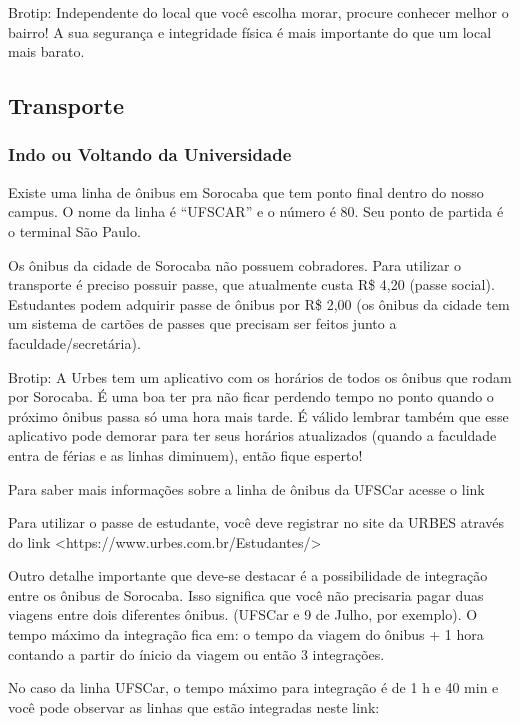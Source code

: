 Brotip: Independente do local que você escolha morar, procure conhecer melhor o bairro! A sua segurança e integridade física é mais importante do que um local mais barato.

\subsection{Transporte}
\subsubsection{Indo ou Voltando da Universidade}
Existe uma linha de ônibus em Sorocaba que tem ponto final dentro do nosso campus. O nome da linha é “UFSCAR” e o número é 80. Seu ponto de partida é o terminal São Paulo.

Os ônibus da cidade de Sorocaba não possuem cobradores. Para utilizar o transporte é preciso possuir passe, que atualmente custa R\$ 4,20 (passe social). Estudantes podem adquirir passe de ônibus por R\$ 2,00 (os ônibus da cidade tem um sistema de cartões de passes que precisam ser feitos junto a faculdade/secretária).

Brotip: A Urbes tem um aplicativo com os horários de todos os ônibus que rodam por Sorocaba. É uma boa ter pra não ficar perdendo tempo no ponto quando o próximo ônibus passa só uma hora mais tarde. É válido lembrar também que esse aplicativo pode demorar para ter seus horários atualizados (quando a faculdade entra de férias e as linhas diminuem), então fique esperto!

Para saber mais informações sobre a linha de ônibus da UFSCar acesse o link 

Para utilizar o passe de estudante, você deve registrar no site da URBES através do link <https://www.urbes.com.br/Estudantes/>

Outro detalhe importante que deve-se destacar é a possibilidade de integração entre os ônibus de Sorocaba. Isso significa que você não precisaria pagar duas viagens entre dois diferentes ônibus. (UFSCar e 9 de Julho, por exemplo). O tempo máximo da integração fica em: o tempo da viagem do ônibus + 1 hora contando a partir do ínicio da viagem ou então 3 integrações.

No caso da linha UFSCar, o tempo máximo para integração é de 1 h e 40 min e você pode observar as linhas que estão integradas neste link: 

